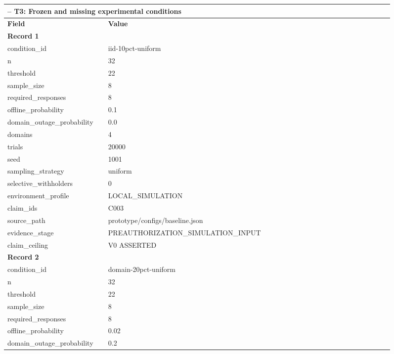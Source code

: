 \begingroup
\setlength{\tabcolsep}{2pt}
\small\sloppy
\begin{longtable}{|p{0.24\linewidth}|p{0.68\linewidth}|}
\hline
\multicolumn{2}{|l|}{\KeystoneDraftTableNotice{} -- T3: Frozen and missing experimental conditions} \\ \hline
\textbf{Field} & \textbf{Value} \\ \hline
\multicolumn{2}{|l|}{\textbf{Record 1}} \\ \hline
condition\_\allowbreak{}id & iid-10pct-uniform \\ \hline
n & 32 \\ \hline
threshold & 22 \\ \hline
sample\_\allowbreak{}size & 8 \\ \hline
required\_\allowbreak{}responses & 8 \\ \hline
offline\_\allowbreak{}probability & 0.1 \\ \hline
domain\_\allowbreak{}outage\_\allowbreak{}probability & 0.0 \\ \hline
domains & 4 \\ \hline
trials & 20000 \\ \hline
seed & 1001 \\ \hline
sampling\_\allowbreak{}strategy & uniform \\ \hline
selective\_\allowbreak{}withholders & 0 \\ \hline
environment\_\allowbreak{}profile & LOCAL\_\allowbreak{}SIMULATION \\ \hline
claim\_\allowbreak{}ids & C003 \\ \hline
source\_\allowbreak{}path & prototype/configs/baseline.json \\ \hline
evidence\_\allowbreak{}stage & PREAUTHORIZATION\_\allowbreak{}SIMULATION\_\allowbreak{}INPUT \\ \hline
claim\_\allowbreak{}ceiling & V0 ASSERTED \\ \hline
\multicolumn{2}{|l|}{\textbf{Record 2}} \\ \hline
condition\_\allowbreak{}id & domain-20pct-uniform \\ \hline
n & 32 \\ \hline
threshold & 22 \\ \hline
sample\_\allowbreak{}size & 8 \\ \hline
required\_\allowbreak{}responses & 8 \\ \hline
offline\_\allowbreak{}probability & 0.02 \\ \hline
domain\_\allowbreak{}outage\_\allowbreak{}probability & 0.2 \\ \hline

\end{longtable}
